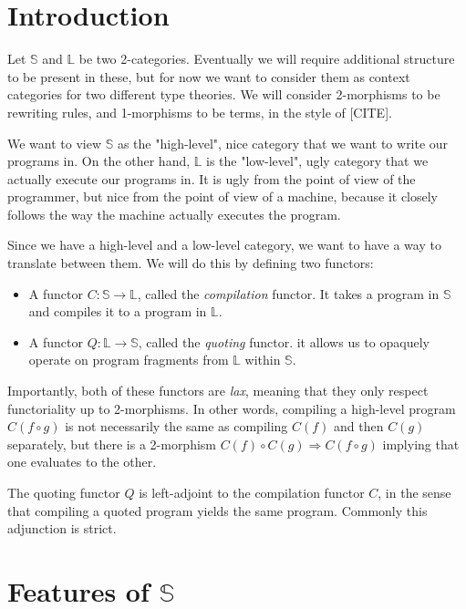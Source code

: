 \section{Introduction}

\def\S{\mathbb{S}}
\def\L{\mathbb{L}}
\def\funct{\longrightarrow}

Let $\S$ and $\L$ be two 2-categories. Eventually we will require additional
structure to be present in these, but for now we want to consider them as
context categories for two different type theories. We will consider
2-morphisms to be rewriting rules, and 1-morphisms to be terms, in the style of
  [CITE].

We want to view $\S$ as the "high-level", nice category that we want to write
our programs in. On the other hand, $\L$ is the "low-level", ugly category that
we actually execute our programs in. It is ugly from the point of view of the
programmer, but nice from the point of view of a machine, because it closely
follows the way the machine actually executes the program.

Since we have a high-level and a low-level category, we want to have a way to
translate between them. We will do this by defining two functors:
\begin{itemize}
  \item A functor $C : \S \funct \L $, called the \emph{compilation} functor. It takes
        a program in $\S$ and compiles it to a program in $\L$.
  \item A functor $Q : \L \funct \S $, called the \emph{quoting} functor. it allows us
        to opaquely operate on program fragments from $\L$ within $\S$.
\end{itemize}

Importantly, both of these functors are \emph{lax}, meaning that they only
respect functoriality up to 2-morphisms. In other words, compiling a high-level
program $C(f \circ g)$ is not necessarily the same as compiling $C(f)$ and then
$C(g)$ separately, but there is a 2-morphism $ C(f) \circ C(g) \Rightarrow C(f
  \circ g)$ implying that one evaluates to the other.

The quoting functor $Q$ is left-adjoint to the compilation functor $C$, in the
sense that compiling a quoted program yields the same program. Commonly this
adjunction is strict.

\section{Features of $\S$}

